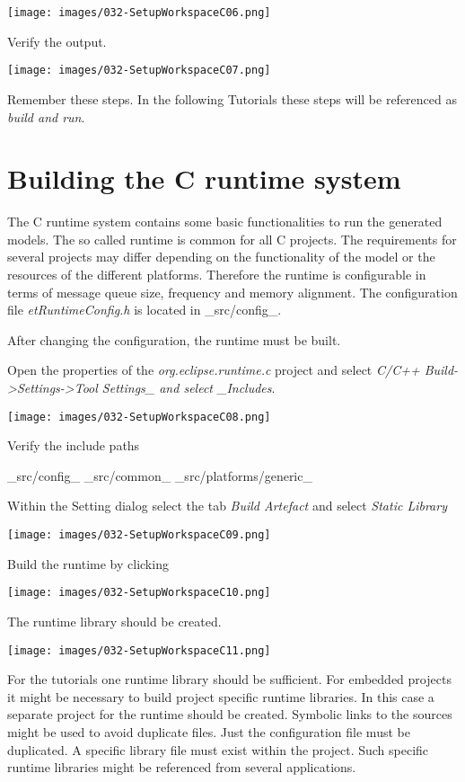 \texttt{[image: images/032-SetupWorkspaceC06.png]}

Verify the output.

\texttt{[image: images/032-SetupWorkspaceC07.png]}

Remember these steps. In the following Tutorials these steps will be referenced as \textit{build and run}.


\section{Building the C runtime system}

The C runtime system contains some basic functionalities to run the generated models. The so called runtime is common for all C projects. The requirements for several projects may differ depending on the functionality of the model or the resources of the different platforms. Therefore the runtime is configurable in terms of message queue size, frequency and memory alignment. The configuration file \textit{etRuntimeConfig.h} is located in _src/config_.

After changing the configuration, the runtime must be built.

Open the properties of the \textit{org.eclipse.runtime.c} project and select \textit{C/C++ Build->Settings->Tool Settings_ and select _Includes}.

\texttt{[image: images/032-SetupWorkspaceC08.png]}

Verify the include paths

_src/config_
_src/common_
_src/platforms/generic_

Within the Setting dialog select the tab \textit{Build Artefact} and select \textit{Static Library}

\texttt{[image: images/032-SetupWorkspaceC09.png]}

Build the runtime by clicking

\texttt{[image: images/032-SetupWorkspaceC10.png]}

The runtime library should be created.

\texttt{[image: images/032-SetupWorkspaceC11.png]}

For the tutorials one runtime library should be sufficient. For embedded projects it might be necessary to build project specific runtime libraries. In this case a separate project for the runtime should be created. Symbolic links to the sources might be used to avoid duplicate files. Just the configuration file must be duplicated. A specific library file must exist within the project. Such specific runtime libraries might be referenced from several applications.     

